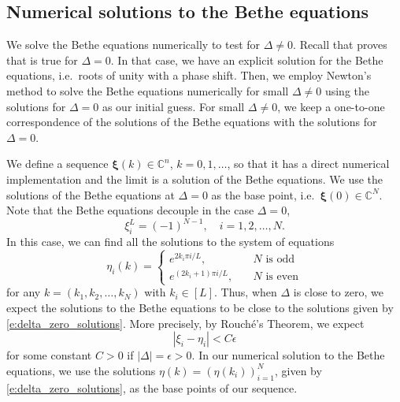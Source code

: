 \documentclass[a4paper,11pt]{article}
\theoremstyle{definition}
\begin{document}
\subsection{Numerical solutions to the Bethe equations}

We solve the Bethe equations numerically to test  for $\Delta \neq 0$. Recall that  proves that  is true for $\Delta=0$. In that case, we have an explicit solution for the Bethe equations, i.e.~roots of unity with a phase shift. Then, we employ Newton's method to solve the Bethe equations numerically for small $\Delta \neq 0$ using the solutions for $\Delta =0$ as our initial guess. For small $\Delta \neq 0$, we keep a one-to-one correspondence of the solutions of the Bethe equations with the solutions for $\Delta =0$.

We define a sequence $\boldsymbol{\xi}(k) \in \mathbb{C}^n$, $k=0, 1, \dots$, so that it has a direct numerical implementation and the limit is a solution of the Bethe equations. We use the solutions of the Bethe equations at $\Delta =0$ as the base point, i.e.~$\boldsymbol{\xi}(0) \in \mathbb{C}^N$. Note that the Bethe equations decouple in the case $\Delta =0$, 
\begin{equation}
    \xi_i^L = (-1)^{N-1}, \quad i = 1, 2, \dots, N.
\end{equation}
In this case, we can find all the solutions to the system of equations
\begin{equation}\label{e:delta_zero_solutions}
    \eta_i(k) = 
    \begin{cases}
    e^{2 k_i  \pi i /L}, &\quad N \text{ is odd}\\
    e^{(2k_i +1 ) \pi i /L}, &\quad N \text { is even}
    \end{cases}
\end{equation}
for any $k= (k_1, k_2, \dots, k_N)$ with $k_i \in [L]$. Thus, when $\Delta$ is close to zero, we expect the solutions to the Bethe equations to be close to the solutions given by \eqref{e:delta_zero_solutions}. More precisely, by Rouch\'e's Theorem, we expect
\begin{equation}
    |\xi_i - \eta_i| < C \epsilon
\end{equation}
for some constant $C> 0$ if $|\Delta| = \epsilon >0$. In our numerical solution to the Bethe equations, we use the solutions $\eta (k) = (\eta(k_i))_{i=1}^{N}$, given by \eqref{e:delta_zero_solutions}, as the base points of our sequence.
\end{document}
